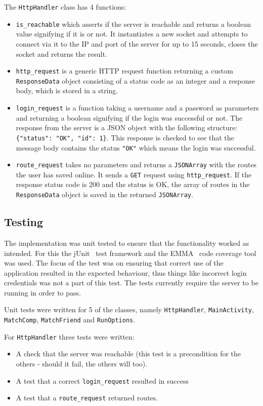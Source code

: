 The \texttt{HttpHandler} class has 4 functions: 
\begin{itemize}
	\item{\texttt{is\_reachable} which asserts if the server is reachable and returns a boolean value signifying if it is or not. It instantiates a new socket and attempts to connect via it to the IP and port of the server for up to 15 seconds, closes the socket and returns the result.}
	\item{\texttt{http\_request} is a generic \ac{HTTP} request function returning a custom \texttt{ResponseData} object consisting of a status code as an integer and a response body, which is stored in a string.}
	\item{\texttt{login\_request} is a function taking a username and a password as parameters and returning a boolean signifying if the login was successful or not. The response from the server is a \ac{JSON} object with the following structure: \texttt{\{"status": "OK", "id": 1\}}. This response is checked to see that the message body contains the status \texttt{"OK"} which means the login was successful.}
	\item{\texttt{route\_request} takes no parameters and returns a \texttt{JSONArray} with the routes the user has saved online. It sends a \texttt{GET} request using \texttt{http\_request}. If the response status code is 200 and the status is OK, the array of routes in the \texttt{ResponseData} object is saved in the returned \texttt{JSONArray}.}
\end{itemize}

\subsection{Testing}
The implementation was unit tested to ensure that the functionality worked as intended. For this the jUnit~\citep{junit} test framework and the EMMA~\citep{emma} code coverage tool was used. The focus of the test was on ensuring that correct use of the application resulted in the expected behaviour, thus things like incorrect login credentials was not a part of this test. The tests currently require the server to be running in order to pass.

Unit tests were written for 5 of the classes, namely \texttt{Http\-Handler}, \texttt{Main\-Activity}, \texttt{Match\-Comp}, \texttt{Match\-Friend} and \texttt{Run\-Options}. 

For \texttt{HttpHandler} three tests were written:

\begin{itemize}
	\item{A check that the server was reachable (this test is a precondition for the others - should it fail, the others will too).}
	\item{A test that a correct \texttt{login\_request} resulted in success }
	\item{A test that a \texttt{route\_request} returned routes.}
\end{itemize}

